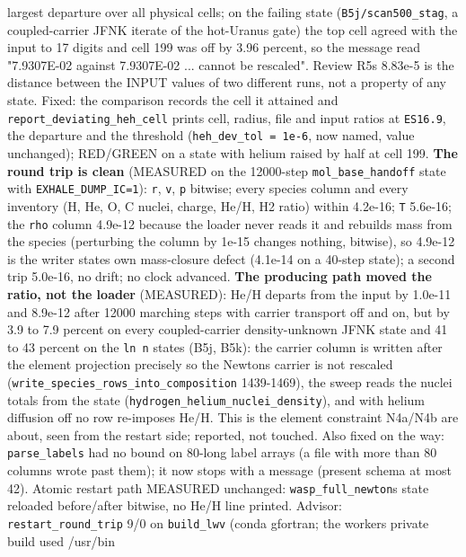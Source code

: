 \documentclass[english,a4paper]{my_memo}
\begin{document}
\begin{itemize}
  largest departure over all physical cells; on the failing state
  (\texttt{B5j/scan500\_stag}, a coupled-carrier JFNK iterate of the hot-Uranus
  gate) the top cell agreed with the input to 17 digits and cell 199 was
  off by 3.96 percent, so the message read "7.9307E-02 against
  7.9307E-02 ... cannot be rescaled". Review R5\textquotesingle s 8.83e-5 is the distance
  between the INPUT values of two different runs, not a property of any
  state. Fixed: the comparison records the cell it attained and
  \texttt{report\_deviating\_heh\_cell} prints cell, radius, file and input ratios
  at \texttt{ES16.9}, the departure and the threshold (\texttt{heh\_dev\_tol\ =\ 1e-6}, now
  named, value unchanged); RED/GREEN on a state with helium raised by half
  at cell 199. \textbf{The round trip is clean} (MEASURED on the 12000-step
  \texttt{mol\_base\_handoff} state with \texttt{EXHALE\_DUMP\_IC=1}): \texttt{r}, \texttt{v}, \texttt{p}
  bitwise; every species column and every inventory (H, He, O, C nuclei,
  charge, He/H, H2 ratio) within 4.2e-16; \texttt{T} 5.6e-16; the \texttt{rho} column
  4.9e-12 because the loader never reads it and rebuilds mass from the
  species (perturbing the column by 1e-15 changes nothing, bitwise), so
  4.9e-12 is the writer state\textquotesingle s own mass-closure defect (4.1e-14 on a
  40-step state); a second trip 5.0e-16, no drift; no clock advanced.
  \textbf{The producing path moved the ratio, not the loader} (MEASURED): He/H
  departs from the input by 1.0e-11 and 8.9e-12 after 12000 marching steps
  with carrier transport off and on, but by 3.9 to 7.9 percent on every
  coupled-carrier density-unknown JFNK state and 41 to 43 percent on the
  \texttt{ln\ n} states (B5j, B5k): the carrier column is written after the
  element projection precisely so the Newton\textquotesingle s carrier is not rescaled
  (\texttt{write\_species\_rows\_into\_composition} 1439-1469), the sweep reads the
  nuclei totals from the state (\texttt{hydrogen\_helium\_nuclei\_density}), and
  with helium diffusion off no row re-imposes He/H. This is the element
  constraint N4a/N4b are about, seen from the restart side; reported, not
  touched. Also fixed on the way: \texttt{parse\_labels} had no bound on 80-long
  label arrays (a file with more than 80 columns wrote past them); it now
  stops with a message (present schema at most 42). Atomic restart path
  MEASURED unchanged: \texttt{wasp\_full\_newton}\textquotesingle s state reloaded before/after
  bitwise, no He/H line printed. Advisor: \texttt{restart\_round\_trip} 9/0 on
  \texttt{build\_lwv} (conda gfortran; the worker\textquotesingle s private build used /usr/bin

\end{itemize}
\end{document}
